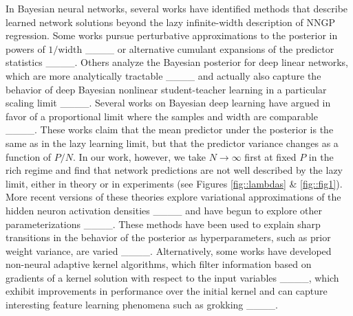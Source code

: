 In Bayesian neural networks, several works have identified methods that describe learned network solutions beyond the lazy infinite-width description of NNGP regression. Some works pursue perturbative approximations to the posterior in powers of $1/\text{width}$ ____ or alternative cumulant expansions of the predictor statistics ____. Others analyze the Bayesian posterior for deep linear networks, which are more analytically tractable ____ and actually also capture the behavior of deep Bayesian nonlinear student-teacher learning in a particular scaling limit ____. Several works on Bayesian deep learning have argued in favor of a proportional limit where the samples and width are comparable ____. These works claim that the mean predictor under the posterior is the same as in the lazy learning limit, but that the predictor variance changes as a function of $P/N$. In our work, however, we take $N \to \infty$ first at fixed $P$ in the rich regime and find that network predictions are not well described by the lazy limit, either in theory or in experiments (see Figures \ref{fig::lambdas} \& \ref{fig::fig1}).  More recent versions of these theories explore variational approximations of the hidden neuron activation densities ____ and have begun to explore other parameterizations ____. These methods have been used to explain sharp transitions in the behavior of the posterior as hyperparameters, such as prior weight variance, are varied ____. Alternatively, some works have developed non-neural adaptive kernel algorithms, which filter information based on gradients of a kernel solution with respect to the input variables ____, which exhibit improvements in performance over the initial kernel and can capture interesting feature learning phenomena such as grokking ____. 

\vspace{-10pt}